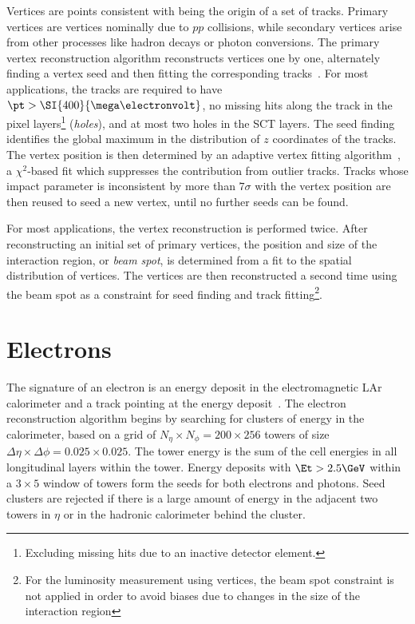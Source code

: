 Vertices are points consistent with being the origin of a set of tracks. Primary vertices are vertices nominally due to $pp$ collisions, while secondary vertices arise from other processes like hadron decays or photon conversions. The primary vertex reconstruction algorithm reconstructs vertices one by one, alternately finding a vertex seed and then fitting the corresponding tracks~\cite{TheATLASCollaboration:2010wy,TheATLASCollaboration:2012tja}. For most applications, the tracks are required to have $\pt>\SI{400}{\mega\electronvolt}$, no missing hits along the track in the pixel layers\footnote{Excluding missing hits due to an inactive detector element.} (\emph{holes}), and at most two holes in the SCT layers. The seed finding identifies the global maximum in the distribution of $z$ coordinates of the tracks. The vertex position is then determined by an adaptive vertex fitting algorithm~\cite{Waltenberger:2007hz}, a $\chi^2$-based fit which suppresses the contribution from outlier tracks. Tracks whose impact parameter is inconsistent by more than $7\sigma$ with the vertex position are then reused to seed a new vertex, until no further seeds can be found. 

For most applications, the vertex reconstruction is performed twice. After reconstructing an initial set of primary vertices, the position and size of the interaction region, or \emph{beam spot}, is determined from a fit to the spatial distribution of vertices. The vertices are then reconstructed a second time using the beam spot as a constraint for seed finding and track fitting\footnote{For the luminosity measurement using vertices, the beam spot constraint is not applied in order to avoid biases due to changes in the size of the interaction region}.

\section{Electrons}\label{sec:event-reconstruction-electrons}
The signature of an electron is an energy deposit in the electromagnetic LAr calorimeter and a track pointing at the energy deposit~\cite{TheATLASCollaboration:2014fu,TheATLASCollaboration:2014vz}. The electron reconstruction algorithm begins by searching for clusters of energy in the calorimeter, based on a grid of $N_{\eta}\times N_{\phi}=200\times256$ towers of size $\Delta\eta\times\Delta\phi = 0.025\times0.025$. The tower energy is the sum of the cell energies in all longitudinal layers within the tower. Energy deposits with $\Et>2.5 \GeV$ within a $3\times 5$ window of towers form the seeds for both electrons and photons. Seed clusters are rejected if there is a large amount of energy in the adjacent two towers in $\eta$ or in the hadronic calorimeter behind the cluster. 

